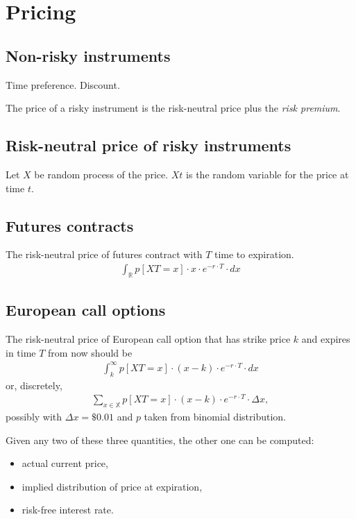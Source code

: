 \chapter{Pricing}

\section{Non-risky instruments}

Time preference.
Discount.

The price of a risky instrument
is the risk-neutral price plus the \emph{risk premium}.

\section{Risk-neutral price of risky instruments}

Let $X$ be random process of the price.
$X t$ is the random variable for the price at time $t$.

\section{Futures contracts}

The risk-neutral price of futures contract with $T$ time to expiration.
\begin{align}
    \int_{\mathbb{R}} p [X T = x] \cdot x \cdot e^{- r \cdot T} \cdot dx
\end{align}

\section{European call options}

The risk-neutral price of European call option
that has strike price $k$ and expires in time $T$ from now
should be
\begin{align}
    \int_k^\infty p [X T = x] \cdot (x - k) \cdot e^{- r \cdot T} \cdot dx
\end{align}
or, discretely,
\begin{align}
    \sum_{x \in \mathbb{X}} p[X T = x] \cdot (x - k) \cdot e^{- r \cdot T} \cdot \Delta x,
\end{align}
possibly with $\Delta x = \$ 0.01$
and $p$ taken from binomial distribution.

Given any two of these three quantities,
the other one can be computed:
\begin{itemize}
    \item actual current price,
    \item implied distribution of price at expiration,
    \item risk-free interest rate.
\end{itemize}

